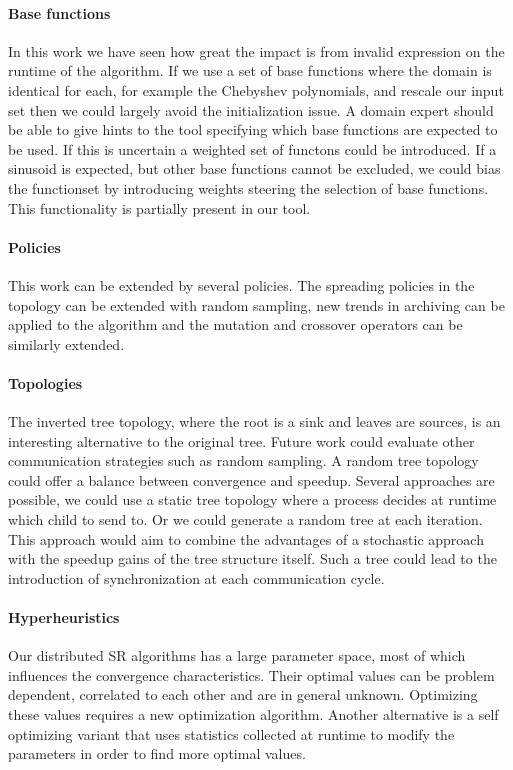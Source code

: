 \paragraph{Base functions}
In this work we have seen how great the impact is from invalid expression on the runtime of the algorithm. If we use a set of base functions where the domain is identical for each, for example the Chebyshev polynomials, and rescale our input set then we could largely avoid the initialization issue.
A domain expert should be able to give hints to the tool specifying which base functions are expected to be used. If this is uncertain a weighted set of functons could be introduced. If a sinusoid is expected, but other base functions cannot be excluded, we could bias the functionset by introducing weights steering the selection of base functions. This functionality is partially present in our tool.

\paragraph{Policies}
This work can be extended by several policies. The spreading policies in the topology can be extended with random sampling, new trends in archiving can be applied to the algorithm and the mutation and crossover operators can be similarly extended. 

\paragraph{Topologies}
The inverted tree topology, where the root is a sink and leaves are sources, is an interesting alternative to the original tree. Future work could evaluate other communication strategies such as random sampling. A random tree topology could offer a balance between convergence and speedup. Several approaches are possible, we could use a static tree topology where a process decides at runtime which child to send to. Or we could generate a random tree at each iteration. This approach would aim to combine the advantages of a stochastic approach with the speedup gains of the tree structure itself. Such a tree could lead to the introduction of synchronization at each communication cycle.

\paragraph{Hyperheuristics}
Our distributed SR algorithms has a large parameter space, most of which influences the convergence characteristics. Their optimal values can be problem dependent, correlated to each other and are in general unknown. Optimizing these values requires a new optimization algorithm. Another alternative is a self optimizing variant that uses statistics collected at runtime to modify the parameters in order to find more optimal values.

